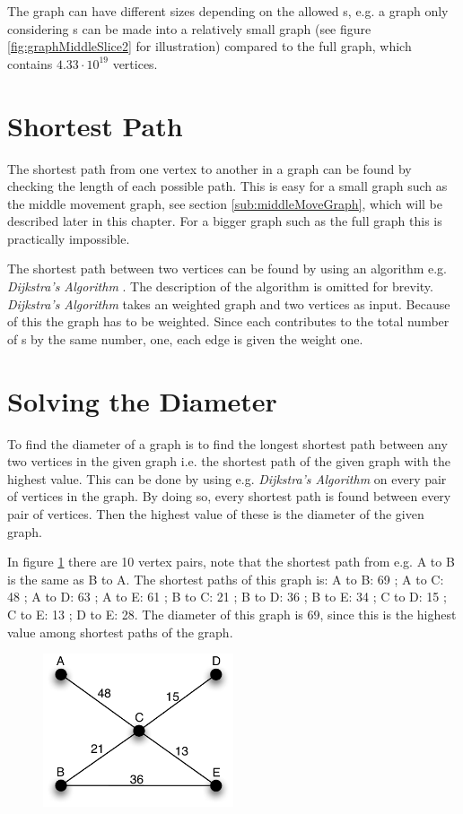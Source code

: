 The \rubik{} graph can have different sizes depending on the allowed \twist{}s, e.g. a graph only considering  \twist{}s can be made into a relatively small graph (see figure \ref{fig:graphMiddleSlice2} for illustration) compared to the full \rubik{} graph, which contains $4.33 \cdot 10^{19}$ vertices.

\section{Shortest Path}
The shortest path from one vertex to another in a graph can be found by checking the length of each possible path. 
This is easy for a small graph such as the middle movement graph, see section \ref{sub:middleMoveGraph}, which will be described later in this chapter. For a bigger graph such as the full \rubik{} graph this is practically impossible. 

The shortest path between two vertices can be found by using an algorithm e.g. \textit{Dijkstra's Algorithm} \cite[p. 651]{Rosen07}. The description of the algorithm is omitted for brevity. \textit{Dijkstra's Algorithm} takes an weighted graph and two vertices as input. 
Because of this the \rubik{} graph has to be weighted. Since each \twist{} contributes to the total number of \twist{}s by the same number, one, each edge is given the weight one. 

\section{Solving the Diameter}
To find the diameter of a graph is to find the longest shortest path between any two vertices in the given graph i.e. the shortest path of the given graph with the highest value. 
This can be done by using e.g. \textit{Dijkstra's Algorithm} on every pair of vertices in the graph.
By doing so, every shortest path is found between every pair of vertices.
Then the highest value of these is the diameter of the given graph.

In figure \ref{fig:diameter} there are 10 vertex pairs, note that the shortest path from e.g. A to B is the same as B to A. The shortest paths of this graph is: A to B: 69 ; A to C: 48 ; A to D: 63 ; A to E: 61 ; B to C: 21 ; B to D: 36 ; B to E: 34 ; C to D: 15 ; C to E: 13 ; D to E: 28. The diameter of this graph is 69, since this is the highest value among shortest paths of the graph.

\begin{figure}[htb]
	\centering
		\includegraphics[width = 0.5\textwidth]{input/pics/diameter}
	\caption{}
	\label{fig:diameter}
\end{figure}

